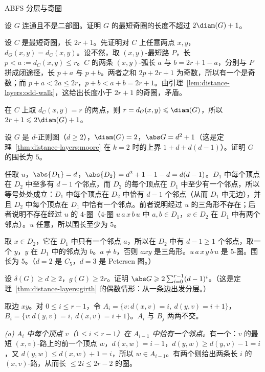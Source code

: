 \begin{exercises}{A}{BFS 分层与奇圈}
\item\label{ex:distance-layers:A1} 设 $G$ 连通且不是二部图。证明 $G$ 的最短奇圈的长度不超过 $2\diam(G)+1$。
\begin{solution}
设 $C$ 是最短奇圈，长 $2r+1$。先证明对 $C$ 上任意两点 $x,y$，$d_G(x,y)=d_C(x,y)$。设不然，取 $(x,y)$-最短路 $P$，长 $p<a:=d_C(x,y)\leqslant r$。$C$ 的两条 $(x,y)$-弧长 $a$ 与 $b=2r+1-a$，分别与 $P$ 拼成闭途径，长 $p+a$ 与 $p+b$。两者之和 $2p+2r+1$ 为奇数，所以有一个是奇数；而 $p+a<2a\leqslant2r$，$p+b<a+b=2r+1$。由引理~\ref{lem:distance-layers:odd-walk}，这给出长度小于 $2r+1$ 的奇圈，矛盾。

在 $C$ 上取 $d_C(x,y)=r$ 的两点，则 $r=d_G(x,y)\leqslant\diam(G)$，所以 $2r+1\leqslant2\diam(G)+1$。
\end{solution}

\item\label{ex:distance-layers:A2} 设 $G$ 是 $d$-正则图（$d\geqslant2$），$\diam(G)=2$，$\abs G=d^2+1$（这是定理~\ref{thm:distance-layers:moore} 在 $k=2$ 时的上界 $1+d+d(d-1)$）。证明 $G$ 的围长为 $5$。
\begin{solution}
任取 $u$，$\abs{D_1}=d$，$\abs{D_2}=d^2+1-1-d=d(d-1)$。$D_1$ 中每个顶点在 $D_2$ 中至多有 $d-1$ 个邻点，而 $D_2$ 的每个顶点在 $D_1$ 中至少有一个邻点，所以等号处处成立：$D_1$ 中每个顶点在 $D_2$ 中恰有 $d-1$ 个邻点（从而 $D_1$ 中无边），并且 $D_2$ 中每个顶点在 $D_1$ 中恰有一个邻点。前者说明经过 $u$ 的三角形不存在；后者说明不存在经过 $u$ 的 $4$-圈（$4$-圈 $u\,a\,x\,b\,u$ 中 $a,b\in D_1$，$x\in D_2$ 在 $D_1$ 中有两个邻点）。$u$ 任意，所以围长至少为 $5$。

取 $x\in D_2$，它在 $D_1$ 中只有一个邻点 $a$，所以在 $D_2$ 中有 $d-1\geqslant1$ 个邻点，取一个 $y$，$y$ 在 $D_1$ 中的邻点为 $b$。$a\neq b$，否则 $axy$ 是三角形。$u\,a\,x\,y\,b\,u$ 是 $5$-圈。围长为 $5$。（$d=2$ 是 $C_5$，$d=3$ 是 Petersen 图。）
\end{solution}

\item\label{ex:distance-layers:A3} 设 $\delta(G)\geqslant d\geqslant2$，$g(G)\geqslant2r$。证明 $\abs G\geqslant2\sum_{i=0}^{r-1}(d-1)^i$。（这是定理~\ref{thm:distance-layers:girth} 的偶数情形：从一条边出发分层。）
\begin{solution}
取边 $xy$。对 $0\leqslant i\leqslant r-1$，令 $A_i=\{v:d(x,v)=i,\ d(y,v)=i+1\}$，$B_i=\{v:d(y,v)=i,\ d(x,v)=i+1\}$。$A_i$ 与 $B_j$ 两两不交。

\emph{(a) $A_i$ 中每个顶点 $v$（$1\leqslant i\leqslant r-1$）在 $A_{i-1}$ 中恰有一个邻点。}有一个：$v$ 的最短 $(x,v)$-路上的前一个顶点 $w$，$d(x,w)=i-1$，$d(y,w)\geqslant d(y,v)-1=i$，又 $d(y,w)\leqslant d(x,w)+1=i$，所以 $w\in A_{i-1}$。有两个则给出两条长 $i$ 的 $(x,v)$-路，从而长 $\leqslant2i\leqslant2r-2$ 的圈。


\end{solution}
\end{exercises}
